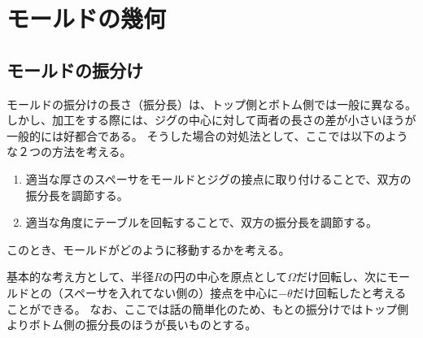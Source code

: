 \part{モールドの幾何}



\chapter{モールドの振分け}
モールドの振分けの長さ（振分長）は、トップ側とボトム側では一般に異なる。
しかし、加工をする際には、ジグの中心に対して両者の長さの差が小さいほうが一般的には好都合である。
そうした場合の対処法として、ここでは以下のような２つの方法を考える。
\begin{enumerate}
\item
適当な厚さのスペーサをモールドとジグの接点に取り付けることで、双方の振分長を調節する。
\item
適当な角度にテーブルを回転することで、双方の振分長を調節する。
\end{enumerate}
このとき、モールドがどのように移動するかを考える。

基本的な考え方として、半径$R$の円の中心を原点として$\Omega$だけ回転し、次にモールドとの（スペーサを入れてない側の）接点を中心に$-\theta$だけ回転したと考えることができる。
なお、ここでは話の簡単化のため、もとの振分けではトップ側よりボトム側の振分長のほうが長いものとする。




